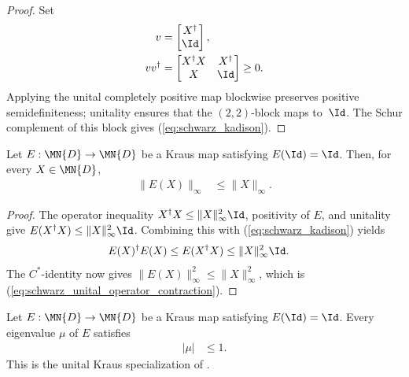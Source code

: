 \begin{proof}
    \leanok
    Set
    \begin{align}
        v
        &=
        \begin{bmatrix}
            X^\dagger\\
            \Id
        \end{bmatrix},
        \notag\\
        vv^\dagger
        &=
        \begin{bmatrix}
            X^\dagger X & X^\dagger\\
            X & \Id
        \end{bmatrix}
        \geq 0.
        \notag
    \end{align}
    Applying the unital completely positive map blockwise preserves positive
    semidefiniteness; unitality ensures that the $(2,2)$-block maps to~$\Id$.
    The Schur complement of this block gives
    (\ref{eq:schwarz_kadison}).
\end{proof}

\begin{theorem}
    \label{thm:unital_kraus_operator_norm_contraction}
    \leanok
    Let $E:\MN{D}\to\MN{D}$ be a Kraus map satisfying $E(\Id)=\Id$.
    Then, for every $X\in\MN{D}$,
    \begin{align}
        \|E(X)\|_\infty
        &\leq \|X\|_\infty.
        \label{eq:schwarz_unital_operator_contraction}
    \end{align}
\end{theorem}

\begin{proof}
    \leanok
    The operator inequality
    $X^\dagger X\leq\|X\|_\infty^2\Id$, positivity of $E$, and unitality give
    $E(X^\dagger X)\leq\|X\|_\infty^2\Id$. Combining this with
    (\ref{eq:schwarz_kadison}) yields
    \begin{align}
        E(X)^\dagger E(X)
        &\leq E(X^\dagger X)
        \leq \|X\|_\infty^2\Id.
        \notag
    \end{align}
    The $C^*$-identity now gives
    $\|E(X)\|_\infty^2\leq\|X\|_\infty^2$, which is
    (\ref{eq:schwarz_unital_operator_contraction}).
\end{proof}

\begin{theorem}
    \label{thm:unital_kraus_eigenvalue_bound}
    \leanok
    Let $E:\MN{D}\to\MN{D}$ be a Kraus map satisfying $E(\Id)=\Id$.
    Every eigenvalue $\mu$ of $E$ satisfies
    \begin{align}
        |\mu|
        &\leq 1.
        \label{eq:schwarz_unital_eigenvalue_bound}
    \end{align}
    This is the unital Kraus specialization of
    \cite[Proposition~6.1]{Wolf2012Quantum}.
\end{theorem}

